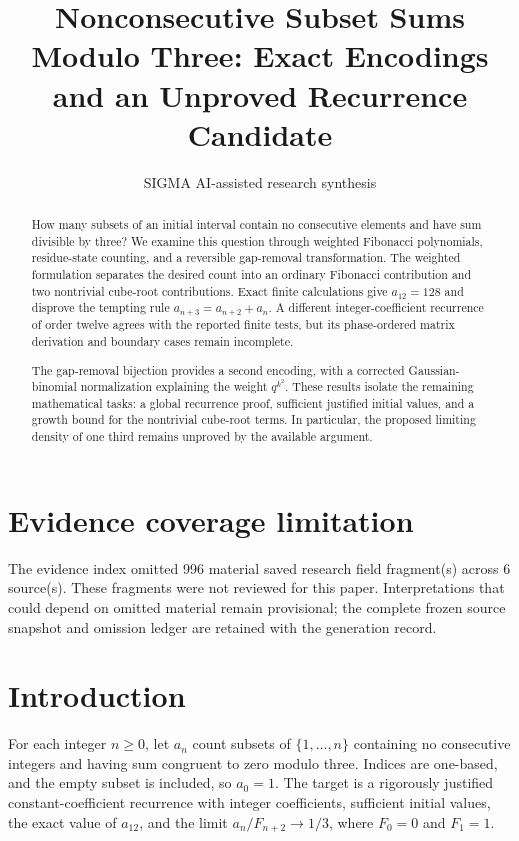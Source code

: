 \documentclass[11pt]{article}
\title{Nonconsecutive Subset Sums Modulo Three: Exact Encodings and an Unproved Recurrence Candidate}
\date{}
\author{SIGMA AI-assisted research synthesis}
\begin{document}
\maketitle

\begin{abstract}
How many subsets of an initial interval contain no consecutive elements and have sum divisible by three? We examine this question through weighted Fibonacci polynomials, residue-state counting, and a reversible gap-removal transformation. The weighted formulation separates the desired count into an ordinary Fibonacci contribution and two nontrivial cube-root contributions. Exact finite calculations give $a_{12}=128$ and disprove the tempting rule $a_{n+3}=a_{n+2}+a_n$. A different integer-coefficient recurrence of order twelve agrees with the reported finite tests, but its phase-ordered matrix derivation and boundary cases remain incomplete.

The gap-removal bijection provides a second encoding, with a corrected Gaussian-binomial normalization explaining the weight $q^{k^2}$. These results isolate the remaining mathematical tasks: a global recurrence proof, sufficient justified initial values, and a growth bound for the nontrivial cube-root terms. In particular, the proposed limiting density of one third remains unproved by the available argument.
\end{abstract}
\section*{Evidence coverage limitation}
The evidence index omitted 996 material saved research field fragment(s) across 6 source(s). These fragments were not reviewed for this paper. Interpretations that could depend on omitted material remain provisional; the complete frozen source snapshot and omission ledger are retained with the generation record.
\section{Introduction}
For each integer $n\geq 0$, let $a_n$ count subsets of $\{1,\ldots,n\}$ containing no consecutive integers and having sum congruent to zero modulo three. Indices are one-based, and the empty subset is included, so $a_0=1$. The target is a rigorously justified constant-coefficient recurrence with integer coefficients, sufficient initial values, the exact value of $a_{12}$, and the limit $a_n/F_{n+2}\to 1/3$, where $F_0=0$ and $F_1=1$.
\end{document}

